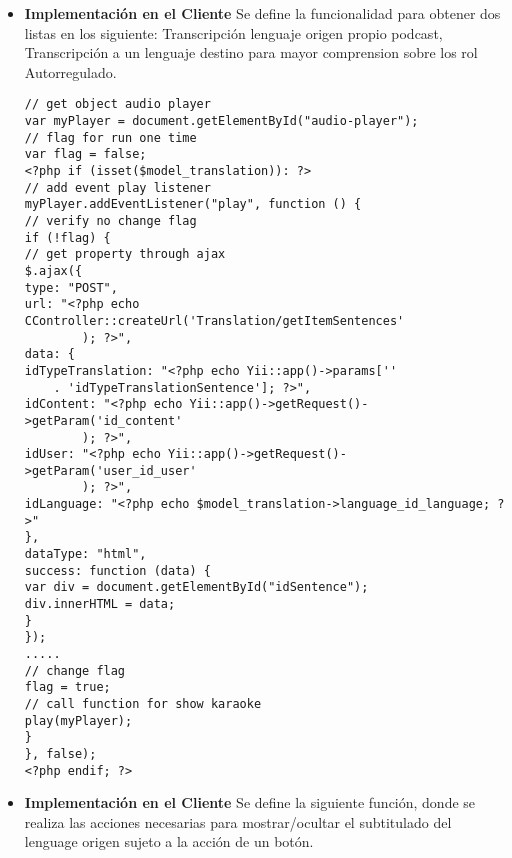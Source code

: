 \begin{itemize}

\item \textbf{Implementaci\'{o}n en el Cliente}
Se define la funcionalidad para obtener dos listas en los siguiente: 
Transcripci\'{o}n lenguaje origen propio podcast, Transcripci\'{o}n
a un lenguaje destino para mayor comprension sobre los rol Autorregulado.

\begin{lstlisting}[caption={Llenado elementos subtitulado}, label={lst:fillSubtitle}]
// get object audio player
var myPlayer = document.getElementById("audio-player");
// flag for run one time
var flag = false;
<?php if (isset($model_translation)): ?>
// add event play listener
myPlayer.addEventListener("play", function () {
// verify no change flag
if (!flag) {
// get property through ajax
$.ajax({
type: "POST",
url: "<?php echo CController::createUrl('Translation/getItemSentences'
        ); ?>",
data: {
idTypeTranslation: "<?php echo Yii::app()->params[''
    . 'idTypeTranslationSentence']; ?>",
idContent: "<?php echo Yii::app()->getRequest()->getParam('id_content'
        ); ?>",
idUser: "<?php echo Yii::app()->getRequest()->getParam('user_id_user'
        ); ?>",
idLanguage: "<?php echo $model_translation->language_id_language; ?>"
},
dataType: "html",
success: function (data) {
var div = document.getElementById("idSentence");
div.innerHTML = data;
}
});
.....
// change flag
flag = true;
// call function for show karaoke
play(myPlayer);
}
}, false);
<?php endif; ?>
\end{lstlisting}

\item \textbf{Implementaci\'{o}n en el Cliente}
Se define la siguiente funci\'{o}n, donde se realiza las acciones necesarias para
mostrar/ocultar el subtitulado del lenguage origen sujeto a la acci\'{o}n de un 
bot\'{o}n.  


\end{itemize}
